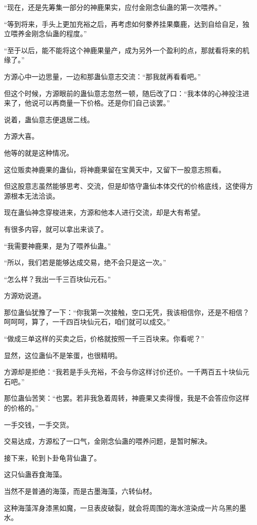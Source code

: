 \begin{this_body}
“现在，还是先筹集一部分的神鹿果实，应付金刚念仙蛊的第一次喂养。”

“等到将来，手头上更加充裕之后，再考虑如何豢养挂果麋鹿，达到自给自足，独立喂养金刚念仙蛊的程度。”

“至于以后，能不能将这个神鹿果量产，成为另外一个盈利的点，那就看将来的机缘了。”

方源心中一边思量，一边和那蛊仙意志交流：“那我就再看看吧。”

但这个时候，方源眼前的蛊仙意志忽然一顿，随后改了口：“我本体的心神投注进来了，他说可以再商量一下价格。还是你们自己谈罢。”

说着，蛊仙意志便退居二线。

方源大喜。

他等的就是这种情况。

这位贩卖神鹿果的蛊仙，将神鹿果留在宝黄天中，又留下一股意志照看。

但这股意志虽然能够思考、交流，但是却恪守蛊仙本体交代的价格底线，这使得方源根本无法洽谈。

现在蛊仙神念穿梭进来，方源和他本人进行交流，却是大有希望。

有很多内容，就可以拿出来谈了。

“我需要神鹿果，是为了喂养仙蛊。”

“所以，我们若是能够达成交易，绝不会只是这一次。”

“怎么样？我出一千三百块仙元石。”

方源劝说道。

那位蛊仙犹豫了一下：“你我第一次接触，空口无凭，我该相信你，还是不相信？呵呵呵，算了，一千四百块仙元石，咱们就可以成交。”

“做成三单这样的买卖之后，价格就按照一千三百块来。你看呢？”

显然，这位蛊仙不是笨蛋，也很精明。

方源却是拒绝：“我若是手头充裕，不会与你这样讨价还价。一千两百五十块仙元石吧。”

那位蛊仙苦笑：“也罢。若非我急着周转，神鹿果又卖得慢，我是不会答应你这样的价格的。”

一手交钱，一手交货。

交易达成，方源松了一口气，金刚念仙蛊的喂养问题，是暂时解决。

接下来，轮到卜卦龟背仙蛊了。

这只仙蛊吞食海藻。

当然不是普通的海藻，而是古墨海藻，六转仙材。

这种海藻浑身漆黑如魔，一旦表皮破裂，就会将周围的海水渲染成一片乌黑的墨水。


\end{this_body}
